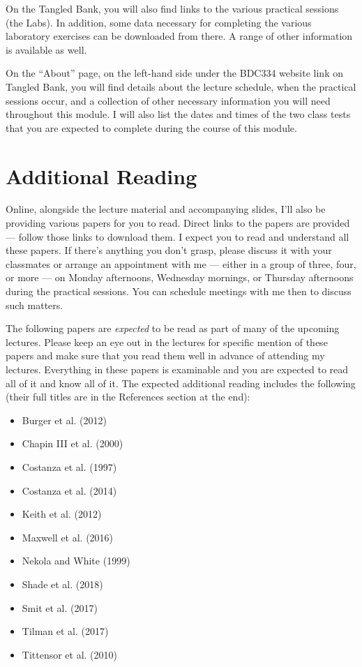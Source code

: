 \documentclass[
  12pt,
]{book}
\providecommand{\tightlist}{%
  \setlength{\itemsep}{0pt}\setlength{\parskip}{0pt}}
\begin{document}
On the Tangled Bank, you will also find links to the various practical
sessions (the Labs). In addition, some data necessary for completing the
various laboratory exercises can be downloaded from there. A range of
other information is available as well.

On the ``About'' page, on the left-hand side under the BDC334 website
link on Tangled Bank, you will find details about the lecture schedule,
when the practical sessions occur, and a collection of other necessary
information you will need throughout this module. I will also list the
dates and times of the two class tests that you are expected to complete
during the course of this module.

\section{Additional Reading}\label{additional-reading}

Online, alongside the lecture material and accompanying slides, I'll
also be providing various papers for you to read. Direct links to the
papers are provided --- follow those links to download them. I expect
you to read and understand all these papers. If there's anything you
don't grasp, please discuss it with your classmates or arrange an
appointment with me --- either in a group of three, four, or more --- on
Monday afternoons, Wednesday mornings, or Thursday afternoons during the
practical sessions. You can schedule meetings with me then to discuss
such matters.

The following papers are \emph{expected} to be read as part of many of
the upcoming lectures. Please keep an eye out in the lectures for
specific mention of these papers and make sure that you read them well
in advance of attending my lectures. Everything in these papers is
examinable and you are expected to read all of it and know all of it.
The expected additional reading includes the following (their full
titles are in the References section at the end):

\begin{itemize}
\tightlist
\item
  Burger et al. (2012)
\item
  Chapin III et al. (2000)
\item
  Costanza et al. (1997)
\item
  Costanza et al. (2014)
\item
  Keith et al. (2012)
\item
  Maxwell et al. (2016)
\item
  Nekola and White (1999)
\item
  Shade et al. (2018)
\item
  Smit et al. (2017)
\item
  Tilman et al. (2017)
\item
  Tittensor et al. (2010)
\end{itemize}
\end{document}
